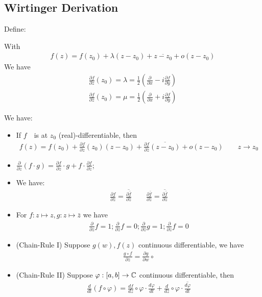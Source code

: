 \documentclass[Total.tex]{subfiles}
\begin{document}
			\subsection{Wirtinger Derivation}
				Define:
				\begin{Def}
					With
					\begin{gather*}
						f(z)=f(z_0)+\lambda(z-z_0)+\overline{z-z_0}+o(z-z_0)
					\end{gather*}
					We have
					\begin{gather*}
						\frac{\partial f}{\partial z}(z_0)=\lambda=\frac{1}{2}(\frac{\partial}{\partial x}-i\frac{\partial f}{\partial y})\\
						\frac{\partial f}{\partial \bar{z}}(z_0)=\mu=\frac{1}{2}(\frac{\partial}{\partial x}+i\frac{\partial f}{\partial y})
					\end{gather*}
				\end{Def}
				\begin{proposition}
					We have:
					\begin{itemize}
						\item If $f$　is at $z_0$ (real)-differentiable, then
						\begin{gather*}
							f(z)=f(z_0)+\frac{\partial f}{\partial z}(z_0)(z-z_0)+\frac{\partial f}{\partial \bar{z}}\overline{(z-z_0)}+o(z-z_0)\qquad z\rightarrow z_0
						\end{gather*}
						\item $\frac{\partial}{\partial z}(f\cdot g)=\frac{\partial f}{\partial z}\cdot g+f\cdot \frac{\partial f}{\partial z}$;
						\item We have:
						\begin{gather*}
							\frac{\partial f}{\partial z}=\overline{\frac{\partial \bar{f}}{\partial \bar{z}}}\qquad \frac{\partial \bar{f}}{\partial \bar{z}}=\overline{\frac{\partial \bar{f}}{\partial z}}
						\end{gather*}
						\item For $f:z\mapsto z,g:z\mapsto \bar{z}$ we have
						\begin{gather*}
							\frac{\partial}{\partial z} f=1;\frac{\partial}{\partial \bar{z}}f=0;\frac{\partial}{\partial \bar{z}}g=1;\frac{\partial}{\partial z}f=0
						\end{gather*}
						\item (Chain-Rule I) Suppose $g(w),f(z)$ continuous differentiable, we have
						\begin{gather*}
							\frac{g\circ f}{\partial z}=\frac{\partial g}{\partial w}\circ
						\end{gather*}
						\item (Chain-Rule II) Suppose $\varphi:[a,b]\rightarrow \mathbb{C}$ continuous differentiable, then
						\begin{gather*}
							\frac{d}{dt}(f\circ \varphi)=\frac{df}{dz}\circ \varphi\cdot \frac{d\varphi}{dt}+\frac{d}{d\bar{z}}\circ \varphi\cdot \overline{\frac{d\varphi}{dt}}
						\end{gather*}
					\end{itemize}
				\end{proposition}
\end{document}
